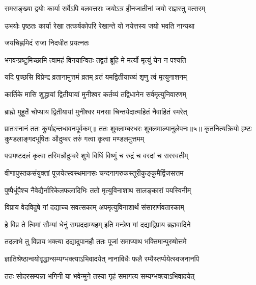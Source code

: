 \twolineshloka
{समसङ्ख्या द्वयोः कार्या सर्वेऽपि बलवत्तराः}
{जयोऽत्र हीनजातीनां जयो राज्ञस्तु वत्सरम्} %

\twolineshloka
{उभयोः पृष्ठतः कार्या रेखा तत्कर्षकोपरि}
{रेखान्ते यो नयेत्तस्य जयो भवति नान्यथा} %


\onelineshloka
{जयचिह्नमिदं राजा निदधीत प्रयत्नतः} %





\twolineshloka
{भगवन्प्रष्टुमिच्छामि त्वामहं विनयान्वितः}
{तद्व्रतं ब्रूहि मे मर्त्यो मृत्युं येन न पश्यति} %


\twolineshloka
{यदि पृच्छसि विप्रेन्द्र व्रतानामुत्तमं व्रतम्}
{व्रतं यमद्वितीयाख्यं शृणु त्वं मृत्युनाशनम्} %

\twolineshloka
{कार्तिके मासि शुद्धायां द्वितीयायां मुनीश्वर}
{कर्तव्यं तद्विधानेन सर्वमृत्युनिवारणम्} %

\twolineshloka
{ब्राह्मे मुहूर्ते चोप्थाय द्वितीयायां मुनीश्वर}
{मनसा चिन्तयेदात्महितं नैवाहितं स्मरेत्} %


प्रातःस्नानं ततः कुर्याद्दन्तधावनपूर्वकम्॥
ततः शुक्लाम्बरधरः शुक्लमाल्यानुलेपनः॥५॥
\twolineshloka
{कृतनित्यक्रियो हृष्टः कुण्डलाङ्गदभूषितः}
{औदुम्बर तरुं गत्वा कृत्वा मण्डलमुत्तमम्} %

\twolineshloka
{पद्ममष्टदलं कृत्वा तस्मिन्नौदुम्बरे शुभे}
{विधिं विष्णुं च रुद्रं च वरदां च सरस्वतीम्} %

\twolineshloka
{वीणापुस्तकसंयुक्तां पूजयेत्स्वस्थमानसः}
{चन्दनागरुकस्तूरीकुङ्कुमैर्द्विजसत्तम} %

\twolineshloka
{पुष्पैर्धूपैश्च नैवेद्यैर्नारिकेलफलादिभिः}
{ततो मृत्युविनाशाथ सालङ्कारां पयस्विनीम्} %

\twolineshloka
{विप्राय वेदविदुषे गां दद्याच्च सवत्सकाम्}
{अपमृत्युविनाशार्थं संसारार्णवतारकाम्} %

\twolineshloka
{हे विप्र ते त्विमां सौम्यां धेनुं सम्प्रददाम्यहम्}
{इति मन्त्रेण गां दद्याद्विप्राय ब्रह्मवादिने} %

\twolineshloka
{तदलाभे तु विप्राय भक्त्या दद्यादुपानहौ}
{ततः पूजां समाप्याथ भक्तिमान्पुरुषोत्तमे} %

\twolineshloka
{ज्ञातिश्रेष्ठान्वयोवृद्धान्सम्यग्भक्त्याऽभिवादयेत्}
{नानाविधैः फलै रम्यैस्तर्प्पयेत्स्वजनानपि} %

\twolineshloka
{ततः सोदरसम्पन्ना भगिनी या भवेन्मुने}
{तस्या गृहं समागत्य सम्यग्भक्त्याऽभिवादयेत्} %

